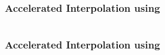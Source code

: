 \begin{frame}[t]
	\frametitle{Accelerated Interpolation using \qvasr}
	\begin{columns}
		\begin{column}{0.35\textwidth}
			\resizebox{0.8\textwidth}{!}{}
		\end{column}
		\begin{column}{0.55\textwidth}
			\resizebox{0.4\textwidth}{!}{}
		\end{column}
	\end{columns}
\end{frame}

\begin{frame}[t]
	\frametitle{Accelerated Interpolation using \qvasr}
	\begin{columns}
		\begin{column}{0.3\textwidth}
			\resizebox{0.8\textwidth}{!}{}
		\end{column}
		\begin{column}{0.35\textwidth}
				\resizebox{\textwidth}{!}{}
		\end{column}
		\begin{column}{0.3\textwidth}
				\onslide<9->{\resizebox{0.65\textwidth}{!}{}}
		\end{column}
	\end{columns}
	\begin{center}
	\end{center}
\end{frame}

